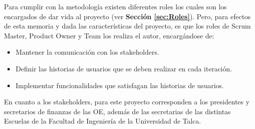 Para cumplir con la metodología existen diferentes roles los cuales son los encargados de dar vida al proyecto (ver \textbf{Sección \ref{sec:Roles}}). Pero, para efectos de esta memoria y dada las características del proyecto, es que los roles de Scrum Master, Product Owner y Team los realiza el autor, encargándose de:

\begin{itemize}
    \item Mantener la comunicación con los stakeholders.
    \item Definir las historias de usuarios que se deben realizar en cada iteración.
    \item Implementar funcionalidades que satisfagan las historias de usuarios.
\end{itemize}

En cuanto a los stakeholders, para este proyecto corresponden a los presidentes y secretarios de finanzas de las OE, además de las secretarias de las distintas Escuelas de la Facultad de Ingeniería de la Universidad de Talca.

